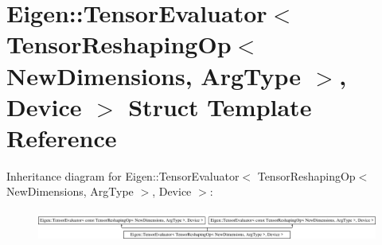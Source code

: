 \hypertarget{struct_eigen_1_1_tensor_evaluator_3_01_tensor_reshaping_op_3_01_new_dimensions_00_01_arg_type_01_4_00_01_device_01_4}{}\section{Eigen\+:\+:Tensor\+Evaluator$<$ Tensor\+Reshaping\+Op$<$ New\+Dimensions, Arg\+Type $>$, Device $>$ Struct Template Reference}
\label{struct_eigen_1_1_tensor_evaluator_3_01_tensor_reshaping_op_3_01_new_dimensions_00_01_arg_type_01_4_00_01_device_01_4}
Inheritance diagram for Eigen\+:\+:Tensor\+Evaluator$<$ Tensor\+Reshaping\+Op$<$ New\+Dimensions, Arg\+Type $>$, Device $>$\+:\begin{figure}[H]
\begin{center}
\leavevmode
\includegraphics[height=1.027523cm]{struct_eigen_1_1_tensor_evaluator_3_01_tensor_reshaping_op_3_01_new_dimensions_00_01_arg_type_01_4_00_01_device_01_4}
\end{center}
\end{figure}
